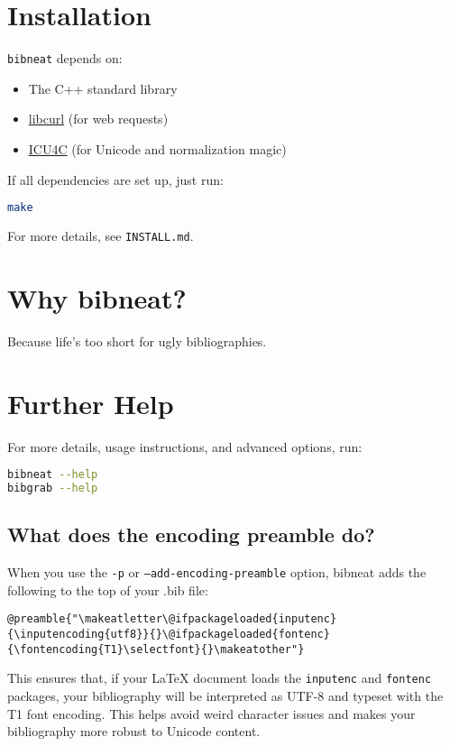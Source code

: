 \documentclass[11pt]{article}
\begin{document}
\section{Installation}
\texttt{bibneat} depends on:
\begin{itemize}
    \item The C++ standard library
    \item \href{https://curl.se/libcurl/}{libcurl} (for web requests)
    \item \href{https://icu.unicode.org/}{ICU4C} (for Unicode and normalization magic)
\end{itemize}
If all dependencies are set up, just run:
\begin{lstlisting}[language=bash]
make
\end{lstlisting}
For more details, see \texttt{INSTALL.md}.

\section{Why bibneat?}
Because life’s too short for ugly bibliographies.

\section{Further Help}
For more details, usage instructions, and advanced options, run:
\begin{lstlisting}[language=bash]
bibneat --help
bibgrab --help
\end{lstlisting}

\subsection*{What does the encoding preamble do?}
When you use the \texttt{-p} or \texttt{--add-encoding-preamble} option, bibneat adds the following to the top of your .bib file:
\begin{lstlisting}
@preamble{"\makeatletter\@ifpackageloaded{inputenc}{\inputencoding{utf8}}{}\@ifpackageloaded{fontenc}{\fontencoding{T1}\selectfont}{}\makeatother"}
\end{lstlisting}
This ensures that, if your LaTeX document loads the \texttt{inputenc} and \texttt{fontenc} packages, your bibliography will be interpreted as UTF-8 and typeset with the T1 font encoding. This helps avoid weird character issues and makes your bibliography more robust to Unicode content.

\end{document}
